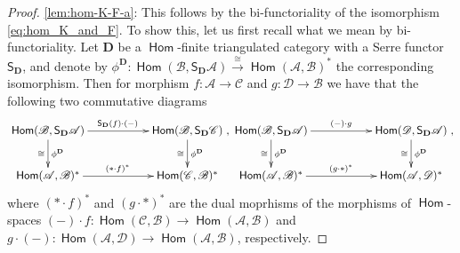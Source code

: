 \documentclass[a4paper,11pt, reqno]{amsart}
\def\DD{\mathbf D}
\def\sA{\mathscr{A}}
\def\sB{\mathscr{B}}
\def\sC{\mathscr{C}}
\def\sD{\mathscr{D}}
\newcommand{\opname}[1]{\operatorname{\mathsf{#1}}}
\newcommand{\Hom}{\opname{Hom}}
\newcommand{\bS}{\mathsf{S}}
\theoremstyle{plain}
\theoremstyle{definition}
\numberwithin{equation}{section}
\newlength{\arrow}
\begin{document}
\begin{proof}
\eqref{lem:hom-K-F-a}:
This follows by the bi-functoriality of the isomorphism \eqref{eq:hom_K_and_F}.
To show this, let us first recall what we mean by bi-functoriality.
Let $\DD$ be a $\Hom$-finite triangulated category with a Serre functor $\bS_\DD$, and denote by $\phi^{\DD} \colon \Hom ( \sB ,  \bS_\DD \sA  ) \xrightarrow{\cong} \Hom ( \sA ,   \sB  )^\ast$ the corresponding isomorphism.
Then for morphism $f \colon \sA \to \sC$ and $g\colon \sD \to \sB$ we have that the following two commutative  diagrams
\begin{equation}\label{eq:Serre-diag}
\xymatrix{
    \Hom (  \sB , \bS_\DD \sA ) \ar@{->}[d]^{\phi^{\DD}}_\cong \ar@{->}[rr]^{ \bS_\DD ( f ) \cdot (-) } & & \Hom ( \sB , \bS_\DD \sC ) \ar@{->}[d]^{\phi^{\DD}}_{\cong} \\
 \Hom ( \sA,   \sB  )^\ast \ar@{->}[rr]^{(\ast \cdot f )^\ast } & & \Hom ( \sC ,   \sB   )^\ast },
 \xymatrix{
    \Hom (  \sB , \bS_\DD \sA ) \ar@{->}[d]^{\phi^{\DD}}_\cong \ar@{->}[rr]^{ (-) \cdot g } & & \Hom ( \sD , \bS_\DD \sA ) \ar@{->}[d]^{\phi^{\DD}}_{\cong} \\
 \Hom ( \sA ,   \sB  )^\ast \ar@{->}[rr]^{( g \cdot \ast )^\ast } & & \Hom ( \sA ,   \sD   )^\ast },
\end{equation}
where $( \ast \cdot f )^\ast$ and $(g \cdot \ast )^\ast$ are the dual moprhisms of the morphisms of $\Hom$-spaces $(-) \cdot f \colon \Hom ( \sC , \sB ) \to \Hom ( \sA ,  \sB )$ and $g \cdot (-) \colon \Hom ( \sA ,  \sD ) \to \Hom ( \sA ,  \sB )$, respectively.


\end{proof}
\end{document}
